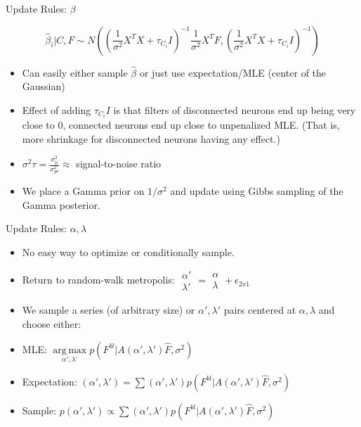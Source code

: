 \documentclass{beamer}
\DeclareMathOperator*{\argmax}{arg\,max}
\begin{document}
\begin{frame}{Update Rules: $\beta$}

\[ \hat{\beta}_i | C, F  \sim  N\left( (\frac{1}{\sigma^2} X^T X + \tau_{C_i} I)^{-1} \frac{1}{\sigma^2} X^T F, ( \frac{1}{\sigma^2} X^TX + \tau_{C_i} I)^{-1} \right) \]

\begin{itemize}
\item Can easily either sample $\hat{\beta}$ or just use expectation/MLE (center of the Gaussian)
\item Effect of adding $\tau_{C_i} I$ is that filters of disconnected neurons end up being very close to 0, connected neurons end up close to unpenalized MLE. (That is, more shrinkage for disconnected neurons having any effect.)
\item $\sigma^2\tau = \frac{\sigma_{li}^2}{\sigma_{pr}^2} \approx$ signal-to-noise ratio
\item We place a Gamma prior on $1/\sigma^2$ and update using Gibbs sampling of the Gamma posterior.
\end{itemize}

\end{frame}

\begin{frame}{Update Rules: $\alpha, \lambda$}
\begin{itemize}
\item No easy way to optimize or conditionally sample.
\item Return to random-walk metropolis: $\begin{smallmatrix} \alpha' \\ \lambda' \end{smallmatrix} = \begin{smallmatrix} \alpha \\ \lambda \end{smallmatrix} + \epsilon_{2x1}$
\item We sample a series (of arbitrary size) or $\alpha', \lambda'$ pairs centered at $\alpha, \lambda$ and choose either:
\item MLE: $\argmax\limits_{\alpha', \lambda'} p( F^{bl} | A(\alpha',\lambda') \hat{F}, \sigma^2 ) $
\item Expectation: $(\alpha', \lambda') = \sum (\alpha', \lambda') p( F^{bl} | A(\alpha',\lambda') \hat{F}, \sigma^2 ) $
\item Sample: $p(\alpha', \lambda') \propto \sum (\alpha', \lambda') p( F^{bl} | A(\alpha',\lambda') \hat{F}, \sigma^2 )$
\end{itemize}
\end{frame}
\end{document}
